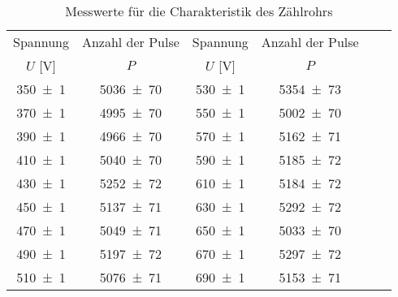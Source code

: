 \begin{table}[!h]
	\centering
	\begin{tabular}{|c|c|c||c|c|c|}
		\hline
		Spannung & Anzahl der Pulse & Spannung & Anzahl der Pulse\\
		$U$ [\si{\volt}] & $P$ &  $U$ [\si{\volt}] & $P$ \\
\hline\hline
		\num{350(1)} & \num{5036(70)} & \num{530(1)} & \num{5354(73)}\\
		\num{370(1)} & \num{4995(70)}  & \num{550(1)} & \num{5002(70)}\\
		\num{390(1)} & \num{4966(70)} &   \num{570(1)} & \num{5162(71)}\\
		\num{410(1)} & \num{5040(70)} &   \num{590(1)} & \num{5185(72)}\\
		\num{430(1)} & \num{5252(72)}  & \num{610(1)} & \num{5184(72)} \\
		\num{450(1)} & \num{5137(71)}  & \num{630(1)} & \num{5292(72)} \\
		\num{470(1)} & \num{5049(71)}  & \num{650(1)} & \num{5033(70)} \\
		\num{490(1)} & \num{5197(72)}  & \num{670(1)} & \num{5297(72)} \\
		\num{510(1)} & \num{5076(71)}  & \num{690(1)} & \num{5153(71)} \\
		\hline
	\end{tabular}
	\caption{Messwerte für die Charakteristik des Zählrohrs \label{tab:Auswertung_Charakteristik}}
\end{table}
